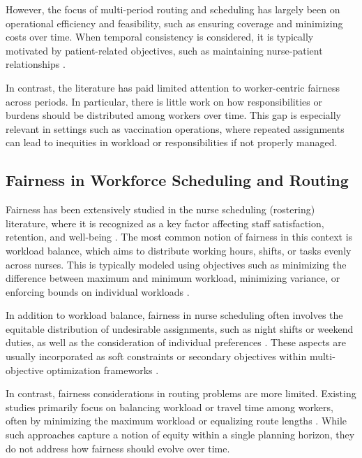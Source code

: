 However, the focus of multi-period routing and scheduling has largely been on operational efficiency and feasibility, such as ensuring coverage and minimizing costs over time. When temporal consistency is considered, it is typically motivated by patient-related objectives, such as maintaining nurse-patient relationships \cite{krityakierne2022npr}. 

In contrast, the literature has paid limited attention to worker-centric fairness across periods. In particular, there is little work on how responsibilities or burdens should be distributed among workers over time. This gap is especially relevant in settings such as vaccination operations, where repeated assignments can lead to inequities in workload or responsibilities if not properly managed.

\subsection{Fairness in Workforce Scheduling and Routing}

Fairness has been extensively studied in the nurse scheduling (rostering) literature, where it is recognized as a key factor affecting staff satisfaction, retention, and well-being \cite{yasmine2024workload,gerlach2025fairness}. The most common notion of fairness in this context is workload balance, which aims to distribute working hours, shifts, or tasks evenly across nurses. This is typically modeled using objectives such as minimizing the difference between maximum and minimum workload, minimizing variance, or enforcing bounds on individual workloads \cite{torres2026multiobjective}.

In addition to workload balance, fairness in nurse scheduling often involves the equitable distribution of undesirable assignments, such as night shifts or weekend duties, as well as the consideration of individual preferences \cite{wolbeckfairness}. These aspects are usually incorporated as soft constraints or secondary objectives within multi-objective optimization frameworks \cite{goalprog2020}.

In contrast, fairness considerations in routing problems are more limited. Existing studies primarily focus on balancing workload or travel time among workers, often by minimizing the maximum workload or equalizing route lengths \cite{kordi2023multiobjective}. While such approaches capture a notion of equity within a single planning horizon, they do not address how fairness should evolve over time.

